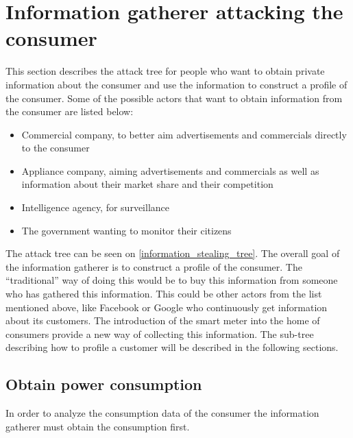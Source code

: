 \section{Information gatherer attacking the consumer}\label{informationGathererVsConsumer}
This section describes the attack tree for people who want to obtain private information about the consumer and use the information to construct a profile of the consumer.
Some of the possible actors that want to obtain information from the consumer are listed below:
\begin{itemize}
\item Commercial company, to better aim advertisements and commercials directly to the consumer
\item Appliance company, aiming advertisements and commercials as well as information about their market share and their competition
\item Intelligence agency, for surveillance
\item The government wanting to monitor their citizens
\end{itemize}

The attack tree can be seen on \cref{information_stealing_tree}.
The overall goal of the information gatherer is to construct a profile of the consumer.
The ``traditional'' way of doing this would be to buy this information from someone who has gathered this information.
This could be other actors from the list mentioned above, like Facebook or Google who continuously get information about its customers.
The introduction of the smart meter into the home of consumers provide a new way of collecting this information.
The sub-tree describing how to profile a customer will be described in the following sections.



\subsection{Obtain power consumption}
In order to analyze the consumption data of the consumer the information gatherer must obtain the consumption first.

